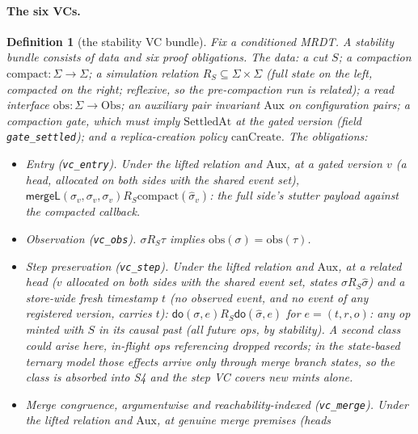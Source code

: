 \documentclass[11pt]{article}
\newtheorem{definition}[theorem]{Definition}
\newcommand{\mergeL}{\mathsf{mergeL}}
\newcommand{\lean}[1]{\texttt{#1}}
\newcommand{\dodo}{\mathsf{do}}
\begin{document}
\paragraph{The six VCs.}

\begin{definition}[the stability VC bundle]
\label{def:stabvc}
Fix a conditioned MRDT. A stability bundle consists of data and six
proof obligations. The data: a cut $S$; a compaction
$\mathrm{compact} : \Sigma \to \Sigma$; a
simulation relation $R_S \subseteq \Sigma \times \Sigma$ (full state on
the left, compacted on the right; reflexive, so the pre-compaction run
is related); a read interface $\mathrm{obs} : \Sigma \to \mathrm{Obs}$;
an auxiliary pair invariant $\mathrm{Aux}$ on configuration pairs; a
compaction gate, which must imply $\mathrm{SettledAt}$ at the gated
version (field \lean{gate\_settled}); and a replica-creation policy
$\mathrm{canCreate}$. The obligations:
\begin{itemize}[leftmargin=2.4em]
\item[\textbf{S1}] \emph{Entry} (\lean{vc\_entry}). Under the lifted
  relation and $\mathrm{Aux}$, at a gated version $v$ (a head, allocated
  on both sides with the shared event set),
  $\mergeL(\sigma_v, \sigma_v, \sigma_v) \mathrel{R_S}
  \mathrm{compact}(\hat{\sigma}_v)$: the full side's stutter payload
  against the compacted callback.
\item[\textbf{S2}] \emph{Observation} (\lean{vc\_obs}).
  $\sigma \mathrel{R_S} \tau$
  implies $\mathrm{obs}(\sigma) = \mathrm{obs}(\tau)$.
\item[\textbf{S3}] \emph{Step preservation} (\lean{vc\_step}). Under
  the lifted relation and $\mathrm{Aux}$, at a related head ($v$
  allocated on both sides with the shared event set, states
  $\sigma \mathrel{R_S} \hat{\sigma}$) and a \emph{store-wide fresh}
  timestamp $t$ (no observed event, and no event of any registered
  version, carries $t$):
  $\dodo(\sigma, e) \mathrel{R_S} \dodo(\hat{\sigma}, e)$ for
  $e = (t, r, o)$: any op minted with $S$ in its causal past (all
  future ops, by stability). A second class could arise here,
  in-flight ops referencing dropped records; in the state-based ternary
  model those effects arrive only through merge branch states, so the
  class is absorbed into S4 and the step VC covers new mints alone.
\item[\textbf{S4}] \emph{Merge congruence, argumentwise and
  reachability-indexed} (\lean{vc\_merge}). Under the lifted relation
  and $\mathrm{Aux}$, at \emph{genuine merge premises} (heads

\end{itemize}
\end{definition}
\end{document}
